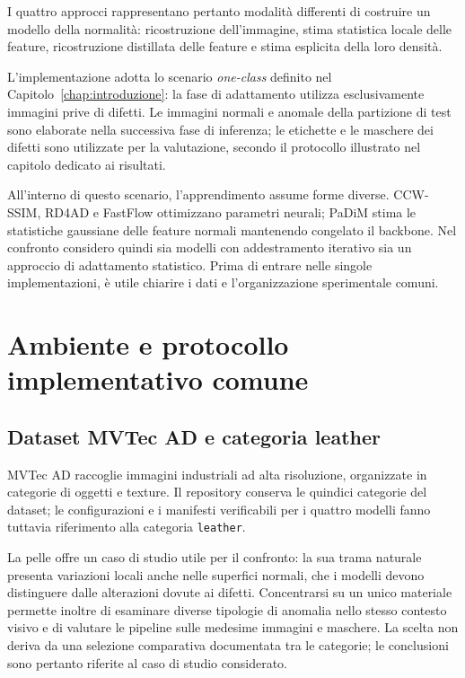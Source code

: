 I quattro approcci rappresentano pertanto modalità differenti di costruire un modello della normalità: ricostruzione dell'immagine, stima statistica locale delle feature, ricostruzione distillata delle feature e stima esplicita della loro densità.

L'implementazione adotta lo scenario \textit{one-class} definito nel Capitolo~\ref{chap:introduzione}: la fase di adattamento utilizza esclusivamente immagini prive di difetti. Le immagini normali e anomale della partizione di test sono elaborate nella successiva fase di inferenza; le etichette e le maschere dei difetti sono utilizzate per la valutazione, secondo il protocollo illustrato nel capitolo dedicato ai risultati.

All'interno di questo scenario, l'apprendimento assume forme diverse. CCW-SSIM, RD4AD e FastFlow ottimizzano parametri neurali; PaDiM stima le statistiche gaussiane delle feature normali mantenendo congelato il backbone. Nel confronto considero quindi sia modelli con addestramento iterativo sia un approccio di adattamento statistico. Prima di entrare nelle singole implementazioni, è utile chiarire i dati e l'organizzazione sperimentale comuni.

\section{Ambiente e protocollo implementativo comune}
\label{sec:cap3-ambiente}

\subsection{Dataset MVTec AD e categoria leather}

MVTec AD \cite{Bergmann_et_al._2019} raccoglie immagini industriali ad alta risoluzione, organizzate in categorie di oggetti e texture. Il repository conserva le quindici categorie del dataset; le configurazioni e i manifesti verificabili per i quattro modelli fanno tuttavia riferimento alla categoria \texttt{leather}.

La pelle offre un caso di studio utile per il confronto: la sua trama naturale presenta variazioni locali anche nelle superfici normali, che i modelli devono distinguere dalle alterazioni dovute ai difetti. Concentrarsi su un unico materiale permette inoltre di esaminare diverse tipologie di anomalia nello stesso contesto visivo e di valutare le pipeline sulle medesime immagini e maschere. La scelta non deriva da una selezione comparativa documentata tra le categorie; le conclusioni sono pertanto riferite al caso di studio considerato.

